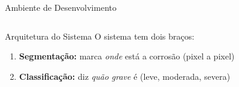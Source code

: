 \documentclass[aspectratio=169, 12pt]{beamer}
\begin{document}
\begin{frame}{Ambiente de Desenvolvimento}
\begin{columns}[T]
        \vspace{0.2cm}

        \begin{block}{\faProjectDiagram\hspace{0.2cm} Arquitetura do Sistema}
            O sistema tem dois braços:
            \begin{enumerate}
                \item \textbf{Segmentação:} marca \textit{onde} está a corrosão (pixel a pixel)
                \item \textbf{Classificação:} diz \textit{quão grave} é (leve, moderada, severa)
            \end{enumerate}
        \end{block}
    \end{columns}
\end{frame}
\end{document}

